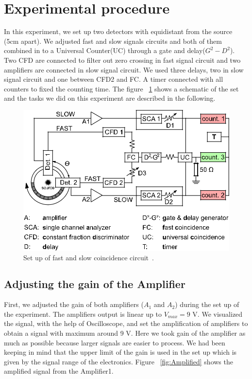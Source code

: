 \section{Experimental procedure}
In this experiment, we set up two detectors with equidistant from the source (5cm apart). We adjusted fast and slow signals circuits and both of them combined in to a Universal Counter(UC) through a gate and delay($G^{2}-D^{2}$). Two CFD are connected to filter out zero crossing in fast signal circuit and two amplifiers are connected in slow signal circuit. We used three delays, two in slow signal circuit and one between CFD2 and FC. A timer connected with all counters to fixed the counting time. The figure ~\ref{fig:CCuit} shows a schematic of the set and the tasks we did on this experiment are described in the following.

\begin{figure}[ht]
	\centering
	\includegraphics[width=0.8\linewidth]{./figs/CirCuit.png}
	\caption{Set up of fast and slow coincidence circuit~\cite{descr}.}%
	\label{fig:CCuit}
\end{figure}
\subsection{Adjusting the gain of the Amplifier}
First, we adjusted the gain of both amplifiers  ($A_{1}$ and  $A_{2}$) during the set up of the experiment. The amplifiers output is linear up to $V_{max}=9$ V. We visualized the signal, with the help of Oscilloscope, and set the amplification of amplifiers  to obtain a signal with maximum around 9 V. Here we took gain of the amplifier as much as possible because larger signals are easier to process. We had been keeping in mind that the upper limit of the gain is used in the set up which is given by the signal range of the electronics. Figure ~\ref{fig:Amplified} shows the amplified signal from the Amplifier1.

